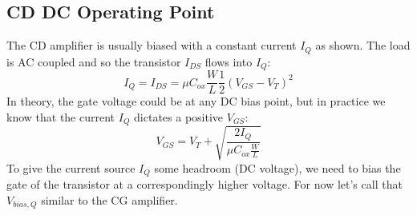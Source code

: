 \subsection{CD DC Operating Point}
The CD amplifier is usually biased with a constant current $I_Q$ as shown.  The load is AC coupled and so the transistor $I_{DS}$ flows into $I_Q$:
    \begin{equation}
        I_Q = {I_{DS}} = \mu {C_{ox}}\frac{W}{L}\frac{1}{2}{({V_{GS}} - {V_T})^2}	
    \end{equation}
In theory, the gate voltage could be at any DC bias point, but in practice we know that the current $I_Q$ dictates a positive $V_{GS}$:
    \begin{equation}
        {V_{GS}} = {V_T} + \sqrt {\frac{{2{I_{Q}}}}{{\mu {C_{ox}}\frac{W}{L}}}} 
    \end{equation}
To give the current source $I_Q$ some headroom (DC voltage), we need to bias the gate of the transistor at a correspondingly higher voltage.  For now let's call that $V_{bias,Q}$ similar to the CG amplifier.
